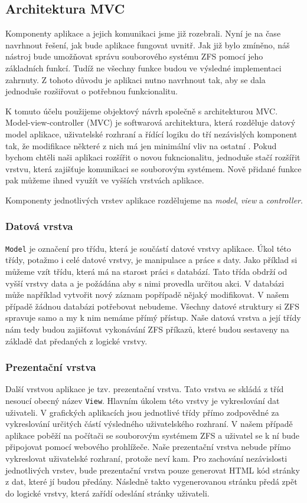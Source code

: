     \subsection{Architektura MVC}
    Komponenty aplikace a jejich komunikaci jsme již rozebrali. Nyní je na čase navrhnout řešení, jak bude aplikace fungovat uvnitř. Jak již bylo zmíněno, náš nástroj bude umožňovat správu souborového systému ZFS pomocí jeho základních funkcí. Tudíž ne všechny funkce budou ve výsledné implementaci zahrnuty. Z tohoto důvodu je aplikaci nutno navrhnout tak, aby se dala jednoduše rozšiřovat o potřebnou funkcionalitu.

    K tomuto účelu použijeme objektový návrh společně s architekturou MVC. Model-view-controller (MVC) je softwarová architektura, která rozděluje datový model aplikace, uživatelské rozhraní a řídící logiku do tří nezávislých komponent tak, že modifikace některé z nich má jen minimální vliv na ostatní \cite{mvc}. Pokud bychom chtěli naši aplikaci rozšířit o novou fukncionalitu, jednoduše stačí rozšířit vrstvu, která zajišťuje komunikaci se souborovým systémem. Nově přidané funkce pak můžeme ihned využít ve vyšších vrstvách aplikace.

    Komponenty jednotlivých vrstev aplikace rozdělujeme na \emph{model}, \emph{view} a \emph{controller}.

        \subsubsection{Datová vrstva}
        \verb|Model| je označení pro třídu, která je součástí datové vrstvy aplikace. Úkol této třídy, potažmo i celé datové vrstvy, je manipulace a práce s daty. Jako příklad si můžeme vzít třídu, která má na starost práci s databází. Tato třída obdrží od vyšší vrstvy data a je požádána aby s nimi provedla určitou akci. V databázi může například vytvořit nový záznam popřípadě nějaký modifikovat. V našem případě žádnou databázi potřebovat nebudeme. Všechny datové struktury si ZFS spravuje samo a my k nim nemáme přímý přístup. Naše datová vrstva a její třídy nám tedy budou zajišťovat vykonávání ZFS příkazů, které budou sestaveny na základě dat předaných z logické vrstvy.
        \subsubsection{Prezentační vrstva}
        Další vrstvou aplikace je tzv. prezentační vrstva. Tato vrstva se skládá z tříd nesoucí obecný název \verb|View|. Hlavním úkolem této vrstvy je vykreslování dat uživateli. V grafických aplikacích jsou jednotlivé třídy přímo zodpovědné za vykreslování určitých částí výsledného uživatelského rozhraní. V našem případě aplikace poběží na počítači se souborovým systémem ZFS a uživatel se k ní bude připojovat pomocí webového prohlížeče. Naše prezentační vrstva nebude přímo vykreslovat uživatelské rozhraní, protože neví kam. Pro zachování nezávislosti jednotlivých vrstev, bude prezentační vrstva pouze generovat HTML kód stránky z dat, které jí budou předány. Následně takto vygenerovanou stránku předá zpět do logické vrstvy, která zařídí odeslání stránky uživateli.
